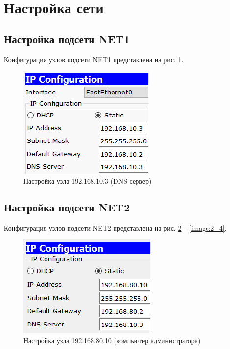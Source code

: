 \section{Настройка сети}


\subsection{Настройка подсети NET1}

Конфигурация узлов подсети NET1 представлена на рис. \ref{image:1_1}.

\begin{figure}[h!]
	\centering
	\includegraphics[scale = 0.64]{images/1_1.png}
	\caption{Настройка узла 192.168.10.3 (DNS сервер)}
	\label{image:1_1}
\end{figure}

\subsection{Настройка подсети NET2}

Конфигурация узлов подсети NET2 представлена на рис. \ref{image:2_1} -- \ref{image:2_4}.

\begin{figure}[h!]
	\centering
	\includegraphics[scale = 0.64]{images/2_1.png}
	\caption{Настройка узла 192.168.80.10 (компьютер администратора)}
	\label{image:2_1}
\end{figure}

